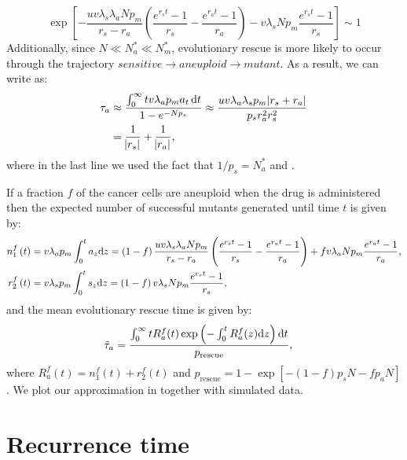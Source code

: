 \documentclass[12pt]{extarticle}
\renewcommand{\d}[1]{\ensuremath{\operatorname{d}\!{#1}}}
\renewcommand{\d}{{\rm d}}
\newcommand{\e}{e}
\newcommand{\presc}{p_\text{rescue}}
\renewcommand{\Delta}{r}
\begin{document}
\begin{appendices}
\begin{equation*}
\exp\left[-\frac{uv\lambda_s\lambda_aNp_m}{\Delta_s-\Delta_a}\left(\frac{\e^{\Delta_s t}-1}{\Delta_s}-\frac{\e^{\Delta_a t}-1}{\Delta_a}\right)-v\lambda_sNp_m\frac{\e^{\Delta_s t}-1}{\Delta_s}\right] \sim 1
\end{equation*}
Additionally, since $N\ll N_a^*\ll N_m^*$, evolutionary rescue is more likely to occur through the trajectory $sensitive \rightarrow aneuploid \rightarrow mutant$. As a result, we can write  as:
\begin{align}\nonumber
\tau_a&\approx\frac{\int_0^\infty t v\lambda_ap_ma_t \,\d t}{1-\e^{-Np_s}}\approx\frac{uv\lambda_a\lambda_sp_m\abs{\Delta_s+\Delta_a}}{p_s\Delta_a^2\Delta_s^2}\\ \label{limitapprox4} %
&=\frac{1}{\abs{\Delta_s}}+\frac{1}{\abs{\Delta_a}},
\end{align} %
where in the last line we used the fact that $1/p_s=N_a^*$ and . %

If a fraction $f$ of the cancer cells are aneuploid when the drug is administered then the expected number of successful mutants generated until time $t$ is given by: %
\begin{align*}
n_1^f\left(t\right)&=v\lambda_ap_m\int_0^ta_{z} \d z = \left(1-f\right)\frac{uv\lambda_s\lambda_aNp_m}{\Delta_s-\Delta_a}\left(\frac{\e^{\Delta_st}-1}{\Delta_s}-\frac{\e^{\Delta_at}-1}{\Delta_a}\right)+fv\lambda_aNp_m\frac{\e^{\Delta_a t}-1}{\Delta_a},\\ 
r_2^f\left(t\right)&=v\lambda_sp_m\int_0^ts_{z} \d z = \left(1-f\right)v\lambda_sNp_m\frac{\e^{\Delta_s t}-1}{\Delta_s},
\end{align*} 
and the mean evolutionary rescue time is given by:
\begin{align}\label{meantimet2SGV}
\tilde{\tau}_a&= \frac{\int_{0}^{\infty}{tR_a^f(t)\exp\left(-\int_0^{t}{R_a^f(z)\d z}\right) \d t}}{\presc},
\end{align}
where $R_a^f(t)=n_1^f\left(t\right)+r_2^f\left(t\right)$ and $\presc = 1-\exp\left[-\left(1-f\right)p_sN-fp_aN\right]$. We plot our approximation in   together with simulated data.

\section{Recurrence time}\label{sec:appendix_recurrence_time} 


\end{appendices}
\end{document}
